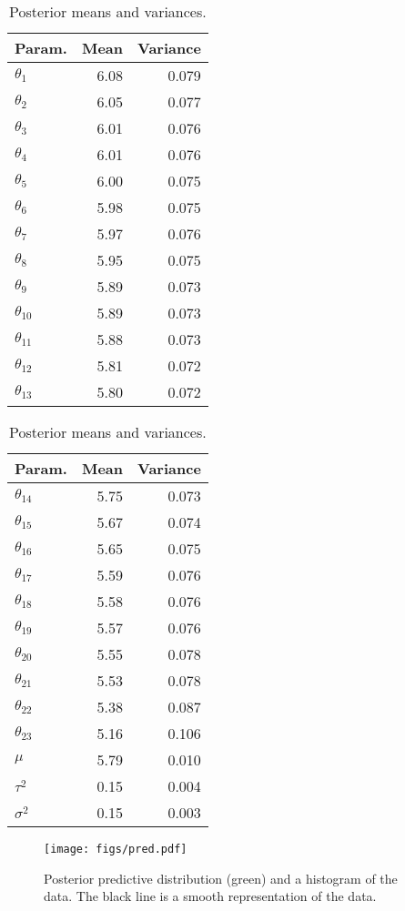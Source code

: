 \documentclass[12pt]{article}
\begin{document}
\begin{table}
\begin{center}
\begin{minipage}{0.5\textwidth}
    \centering
    \begin{tabular}{l|rr}
    Param. & \multicolumn{1}{l}{Mean} & \multicolumn{1}{l}{Variance} \\ \hline
    $\theta_{ 1}$ & 6.08 & 0.079 \\  
    $\theta_{ 2}$ & 6.05 & 0.077 \\
    $\theta_{ 3}$ & 6.01 & 0.076 \\
    $\theta_{ 4}$ & 6.01 & 0.076 \\
    $\theta_{ 5}$ & 6.00 & 0.075 \\
    $\theta_{ 6}$ & 5.98 & 0.075 \\
    $\theta_{ 7}$ & 5.97 & 0.076 \\
    $\theta_{ 8}$ & 5.95 & 0.075 \\
    $\theta_{ 9}$ & 5.89 & 0.073 \\
    $\theta_{10}$ & 5.89 & 0.073 \\
    $\theta_{11}$ & 5.88 & 0.073 \\
    $\theta_{12}$ & 5.81 & 0.072 \\
    $\theta_{13}$ & 5.80 & 0.072 \\
    \end{tabular}
\end{minipage}%
\begin{minipage}{0.5\textwidth}
    \centering
    \begin{tabular}{l|rr}
    Param. & \multicolumn{1}{l}{Mean} & \multicolumn{1}{l}{Variance} \\ \hline
    $\theta_{14}$ & 5.75 & 0.073 \\
    $\theta_{15}$ & 5.67 & 0.074 \\
    $\theta_{16}$ & 5.65 & 0.075 \\
    $\theta_{17}$ & 5.59 & 0.076 \\
    $\theta_{18}$ & 5.58 & 0.076 \\
    $\theta_{19}$ & 5.57 & 0.076 \\
    $\theta_{20}$ & 5.55 & 0.078 \\
    $\theta_{21}$ & 5.53 & 0.078 \\
    $\theta_{22}$ & 5.38 & 0.087 \\
    $\theta_{23}$ & 5.16 & 0.106 \\
    $\mu$         & 5.79 & 0.010 \\
    $\tau^2$      & 0.15 & 0.004 \\
    $\sigma^2$    & 0.15 & 0.003 \\
    \end{tabular}
\end{minipage}
\end{center}
\caption{Posterior means and variances.}
\end{table}
                                                                        

\begin{figure}[H]
\centering
\texttt{[image: figs/pred.pdf]}
\caption{Posterior predictive distribution (green) and a histogram of the data. The black line is a smooth representation of the data.}
\end{figure}
\end{document}
